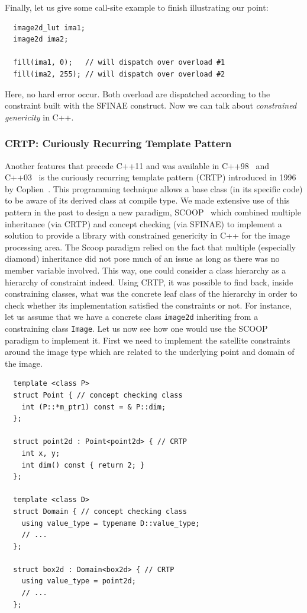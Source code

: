 Finally, let us give some call-site example to finish illustrating our point:

\begin{verbatim}
  image2d_lut ima1;
  image2d ima2;

  fill(ima1, 0);   // will dispatch over overload #1
  fill(ima2, 255); // will dispatch over overload #2
\end{verbatim}
Here, no hard error occur. Both overload are dispatched according to the constraint built with the SFINAE construct. Now
we can talk about \emph{constrained genericity} in C++.


\subsubsection{CRTP: Curiously Recurring Template Pattern}
\label{subsec:crtp}

Another features that precede C++11 and was available in C++98~\parencite{iso.1998.cpp} and
C++03~\parencite{iso.2003.cpp} is the curiously recurring template pattern (CRTP) introduced in 1996 by
Coplien~\parencite{coplien.1996.crtp}. This programming technique allows a base class (in its specific code) to be aware
of its derived class at compile type. We made extensive use of this pattern in the past to design a new paradigm,
SCOOP~\parencite{burrus.2003.mpool, geraud.2006.scoop-pres, geraud.2008.mpool, levillain.2011.phd} which combined
multiple inheritance (via CRTP) and concept checking (via SFINAE) to implement a solution to provide a library with
constrained genericity in C++ for the image processing area. The Scoop paradigm relied on the fact that multiple
(especially diamond) inheritance did not pose much of an issue as long as there was no member variable involved. This
way, one could consider a class hierarchy as a hierarchy of constraint indeed. Using CRTP, it was possible to find back,
inside constraining classes, what was the concrete leaf class of the hierarchy in order to check whether its
implementation satisfied the constraints or not. For instance, let us assume that we have a concrete class
\texttt{image2d} inheriting from a constraining class \texttt{Image}. Let us now see how one would use the SCOOP
paradigm to implement it. First we need to implement the satellite constraints around the image type which are related
to the underlying point and domain of the image.

\begin{verbatim}
  template <class P>
  struct Point { // concept checking class
    int (P::*m_ptr1) const = & P::dim;
  };

  struct point2d : Point<point2d> { // CRTP
    int x, y;
    int dim() const { return 2; }
  };

  template <class D>
  struct Domain { // concept checking class
    using value_type = typename D::value_type;
    // ...
  };

  struct box2d : Domain<box2d> { // CRTP
    using value_type = point2d;
    // ...
  };
\end{verbatim}

